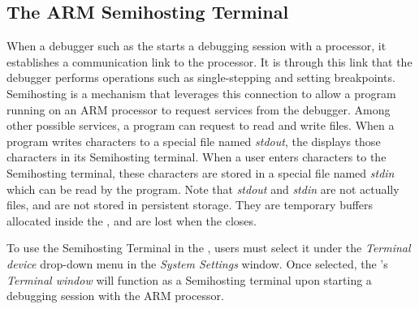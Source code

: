 \documentclass[11pt, twoside, pdftex]{article}
\begin{document}
\subsection{The ARM Semihosting Terminal}


When a debugger such as the \productNameMed{} starts a debugging session with a processor, it establishes a communication link to the processor. It is through this link that the debugger performs operations such as single-stepping and setting breakpoints. Semihosting is a mechanism that leverages this connection to allow a program running on an ARM processor to request services from the debugger. Among other possible services, a program can request to read and write files. When a program writes characters to a special file named \textit{stdout}, the \productNameMed{} displays those characters in its Semihosting terminal. When a user enters characters to the Semihosting terminal, these characters are stored in a special file named \textit{stdin} which can be read by the program. Note that \textit{stdout} and \textit{stdin} are not actually files, and are not stored in persistent storage. They are temporary buffers allocated inside the \productNameMed{}, and are lost when the \productNameMed{} closes.

To use the Semihosting Terminal in the \productNameMed{}, users must select it under the \textit{Terminal device} drop-down menu in the \textit{System Settings} window. Once selected, the \productNameMed{}'s \textit{Terminal window} will function as a Semihosting terminal upon starting a debugging session with the ARM processor.
\end{document}

